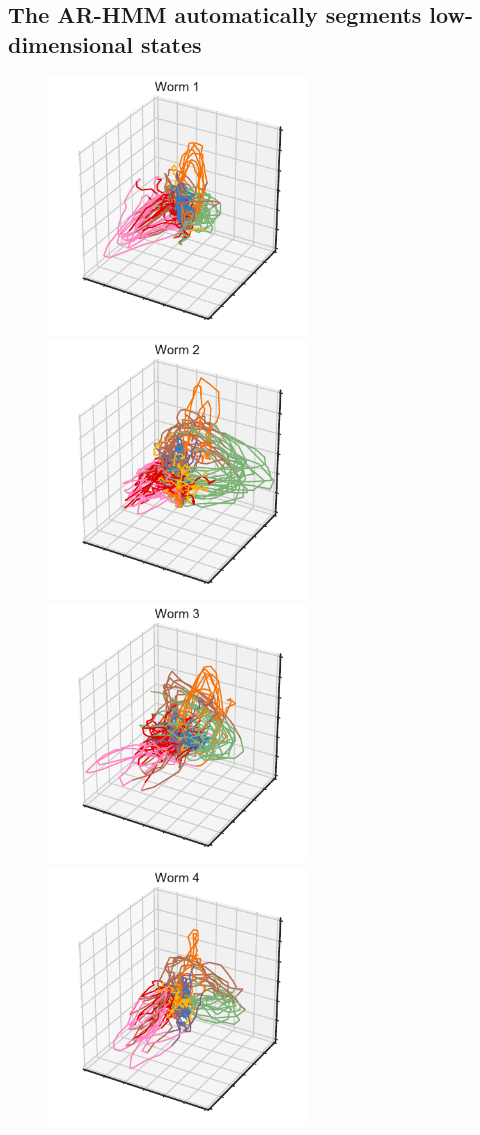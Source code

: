 \documentclass{article}
\begin{document}
\clearpage

\subsection{The AR-HMM automatically segments low-dimensional states}

\begin{figure}[h]
\centering%
\includegraphics[width=2.7in]{figures/arhmm/x_3d_1.pdf}
\includegraphics[width=2.7in]{figures/arhmm/x_3d_2.pdf}
\\
\includegraphics[width=2.7in]{figures/arhmm/x_3d_3.pdf}
\includegraphics[width=2.7in]{figures/arhmm/x_3d_4.pdf}

\end{figure}
\end{document}
